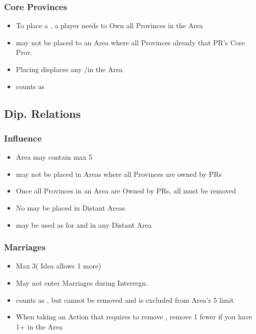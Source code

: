 \documentclass[10pt]{article}
\begin{document}
\subsubsection*{Core Provinces }
\begin{itemize}
	\item To place a \core, a player needs to Own all Provinces in the Area
	\item \core may not be placed to an Area where all Provinces already that PR's Core Prov.
	\item Placing \core displaces any \core/\dnpr in the Area
	\item \core counts as \claim
\end{itemize}

\subsection*{Dip. Relations }
\subsubsection*{Influence }
\begin{itemize}
	\item Area may contain max 5 \influence
	\item \influence may not be placed in Areas where all Provinces are owned by PRs
	\item Once all Provinces in an Area are Owned by PRs, all \influence must be removed
	\item No \influence may be placed in Distant Areas
	\item \colonists may be used as \influence for  and  in any Distant Area
\end{itemize}

\subsubsection*{Marriages }
\begin{itemize}
	\item Max 3\marriages ( Idea allows 1 more)
	\item May not enter Marriages during Interregn.
	\item \marriage counts as \influence, but cannot be removed and is excluded from Area's 5 \influence limit
	\item When taking an Action that requires to remove \influence, remove 1 fewer \influence if you have 1+ \marriages in the Area
\end{itemize}
\end{document}
